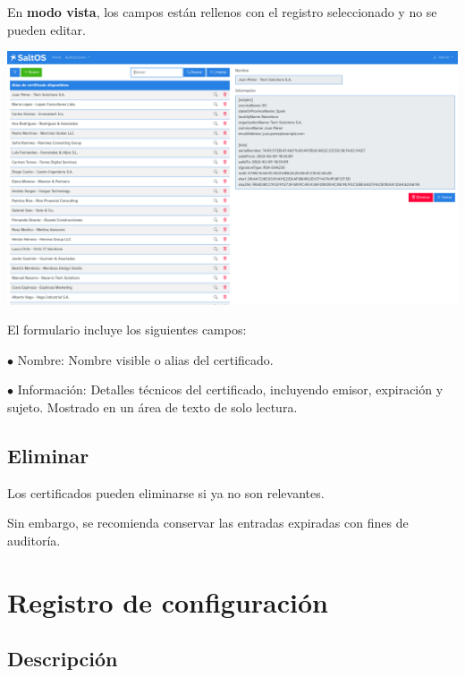 \documentclass[a4paper]{article}
\begin{document}
En \textbf{modo vista}, los campos están rellenos con el registro seleccionado y no se pueden editar.

\begin{center}\includegraphics[width=1\textwidth]{../ujest/snaps/test-screenshots-js-screenshots-certs-certs-view-ab-877-d-2027-f-7-c-71-d-9935999-cce-1-b-802-b-es-es-1-snap.png}\end{center}

El formulario incluye los siguientes campos:

\begin{compactitem}
\item[\color{myblue}$\bullet$] Nombre: Nombre visible o alias del certificado.
\item[\color{myblue}$\bullet$] Información: Detalles técnicos del certificado, incluyendo emisor, expiración y sujeto. Mostrado en un área de texto de solo lectura.
\end{compactitem}

\hypertarget{toc5}{}
\subsection{Eliminar}

Los certificados pueden eliminarse si ya no son relevantes.

Sin embargo, se recomienda conservar las entradas expiradas con fines de auditoría.


\hypertarget{toc6}{}
\section{Registro de configuración}

\hypertarget{toc7}{}
\subsection{Descripción}
\end{document}
